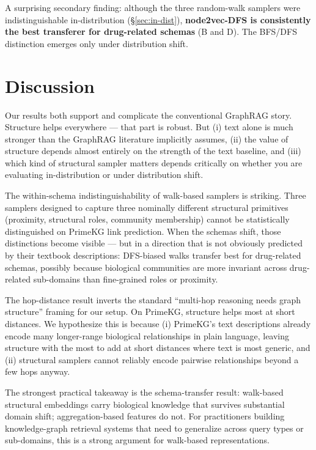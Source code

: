 \documentclass[11pt]{article}
\begin{document}
A surprising secondary finding: although the three random-walk samplers were indistinguishable in-distribution (\S\ref{sec:in-dist}), \textbf{node2vec-DFS is consistently the best transferer for drug-related schemas} (B and D). The BFS/DFS distinction emerges only under distribution shift.

\section{Discussion}

Our results both support and complicate the conventional GraphRAG story. Structure helps everywhere — that part is robust. But (i) text alone is much stronger than the GraphRAG literature implicitly assumes, (ii) the value of structure depends almost entirely on the strength of the text baseline, and (iii) which kind of structural sampler matters depends critically on whether you are evaluating in-distribution or under distribution shift.

The within-schema indistinguishability of walk-based samplers is striking. Three samplers designed to capture three nominally different structural primitives (proximity, structural roles, community membership) cannot be statistically distinguished on PrimeKG link prediction. When the schemas shift, those distinctions become visible — but in a direction that is not obviously predicted by their textbook descriptions: DFS-biased walks transfer best for drug-related schemas, possibly because biological communities are more invariant across drug-related sub-domains than fine-grained roles or proximity.

The hop-distance result inverts the standard ``multi-hop reasoning needs graph structure'' framing for our setup. On PrimeKG, structure helps most at short distances. We hypothesize this is because (i) PrimeKG's text descriptions already encode many longer-range biological relationships in plain language, leaving structure with the most to add at short distances where text is most generic, and (ii) structural samplers cannot reliably encode pairwise relationships beyond a few hops anyway.

The strongest practical takeaway is the schema-transfer result: walk-based structural embeddings carry biological knowledge that survives substantial domain shift; aggregation-based features do not. For practitioners building knowledge-graph retrieval systems that need to generalize across query types or sub-domains, this is a strong argument for walk-based representations.
\end{document}
